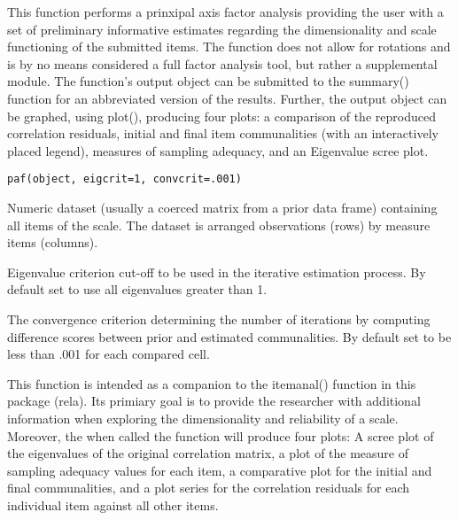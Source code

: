 \begin{Description}\relax
This function performs a prinxipal axis factor analysis providing the user with a set
of preliminary informative estimates regarding the dimensionality and scale functioning of the submitted items. 
The function does not allow for rotations and is by no means considered a full factor analysis tool, but rather 
a supplemental module. The function's output object can be submitted to the summary() function for an abbreviated
version of the results. Further, the output object can be graphed, using plot(), producing four plots: a comparison
of the reproduced correlation residuals, initial and final item communalities (with an interactively placed legend), 
measures of sampling adequacy, and an Eigenvalue scree plot.
\end{Description}
\begin{Usage}
\begin{verbatim}paf(object, eigcrit=1, convcrit=.001)\end{verbatim}
\end{Usage}
\begin{Arguments}
\begin{ldescription}
\item[\code{object}] Numeric dataset (usually a coerced matrix from a prior data frame) containing all items of the scale. The dataset is arranged observations (rows) by measure items (columns). 
\item[\code{eigcrit}] Eigenvalue criterion cut-off to be used in the iterative estimation process. By default set to use all eigenvalues greater than 1.
\item[\code{convcrit}] The convergence criterion determining the number of iterations by computing difference scores between prior and estimated communalities. By default set to be less than .001 for each compared cell. 
\end{ldescription}
\end{Arguments}
\begin{Details}\relax
This function is intended as a companion to the itemanal() function in this package (rela). Its primiary goal is to provide the researcher with additional information when exploring the dimensionality and reliability of a scale. 
Moreover, the when called the function will produce four plots: A scree plot of the eigenvalues of the original correlation matrix, a plot of the measure of sampling adequacy values for each item, a comparative plot for the initial and 
final communalities, and a plot series for the correlation residuals for each individual item against all other items.
\end{Details}
